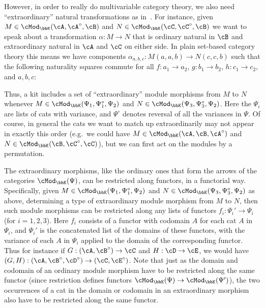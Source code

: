 \documentclass{amsart}
\newcommand{\A}{\cA}
\newcommand{\B}{\cB}
\newcommand{\C}{\cC}
\newcommand{\D}{\cD}
\newcommand{\E}{\cE}
\newcommand{\K}{\bbK}
\let\mod\cMod
\def\modk{\mod_\K}
\renewcommand{\o}{^{\circ}}
\begin{document}
However, in order to really do multivariable category theory, we also need ``extra\-ordinary'' natural transformations as in~\cite{ek:gen-funct-calc}.
For instance, given $M\in\modk(\A,\A\o,\B)$ and $N\in \modk(\C,\C\o,\B)$ we want to speak about a transformation $\alpha:M\to N$ that is ordinary natural in $\B$ and extraordinary natural in $\A$ and $\C$ on either side.
In plain set-based category theory this means we have components $\alpha_{a,b,c}:M(a,a,b) \to N(c,c,b)$ such that the following naturality squares commute for all $f:a_1\to a_2$, $g:b_1\to b_2$, $h:c_1\to c_2$, and $a,b,c$:
Thus, a kit includes a set of ``extraordinary'' module morphisms from $M$ to $N$ whenever $M\in \modk(\Psi_1, \Psi_1\o, \Psi_2)$ and $N\in\modk(\Psi_3, \Psi_3\o, \Psi_2)$.
Here the $\Psi_i$ are lists of cats with variance, and $\Psi\o$ denotes reversal of all the variances in $\Psi$.
Of course, in general the cats we want to match up extraordinarily may not appear in exactly this order (e.g.\ we could have $M\in \modk(\A,\B,\A\o)$ and $N\in \modk(\B,\C\o,\C)$), but we can first act on the modules by a permutation.

The extraordinary morphisms, like the ordinary ones that form the arrows of the categories $\modk(\Psi)$, can be restricted along functors, in a functorial way.
Specifically, given $M\in \modk(\Psi_1, \Psi_1\o,\Psi_2)$ and $N\in\modk(\Psi_3, \Psi_3\o,\Psi_2)$ as above, determining a type of extraordinary module morphism from $M$ to $N$, then such module morphisms can be restricted along any lists of functors $f_i:\Psi_i' \to \Psi_i$ (for $i=1,2,3$).
Here $f_i$ consists of a functor with codomain $A$ for each cat $A$ in $\Psi_i$, and $\Psi_i'$ is the concatenated list of the domains of these functors, with the variance of each $A$ in $\Psi_i$ applied to the domain of the corresponding functor.
Thus for instance if $G:(\A,\B\o) \to \C$ and $H:\D\to \E$, we would have $(G,H):(\A,\B\o,\D\o) \to (\C,\E\o)$.
Note that just as the domain and codomain of an ordinary module morphism have to be restricted along the same functor (since restriction defines functors $\modk(\Psi) \to \modk(\Psi')$), the two occurrences of a cat in the domain or codomain in an extraordinary morphism also have to be restricted along the same functor.
\end{document}
